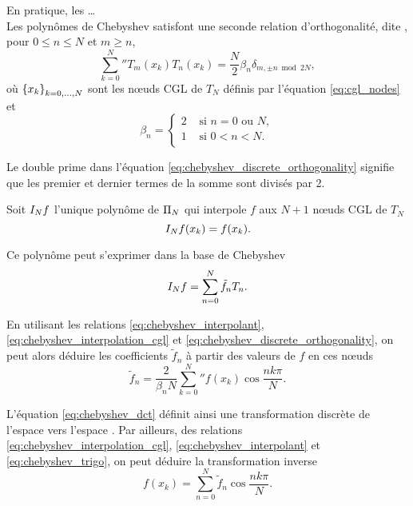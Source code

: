 En pratique, les  \ldots\\
Les polynômes de Chebyshev satisfont une seconde relation d'orthogonalité, dite , pour $0 \leq n \leq N$ et $m \geq n$,
\begin{equation}
	\sum_{k=0}^{N}{''} T_m(x_k) T_n(x_k) = 
	\frac{N}{2} \beta_n \delta_{m,\pm n \bmod{2N}},
	\label{eq:chebyshev_discrete_orthogonality}
\end{equation}
où $\family{x}{k}{0}{N}$ sont les n\oe uds CGL de $T_N$ définis par l'équation \eqref{eq:cgl_nodes} et
\begin{equation}
	\beta_n = 
	\begin{cases}
	 2 & \text{\ si\ } n = 0 \text{\ ou\ } N,   \\ 
	 1 & \text{\ si\ } 0 < n < N.\\ 
	\end{cases}
\end{equation}

Le double prime dans l'équation \eqref{eq:chebyshev_discrete_orthogonality} signifie que les premier et dernier termes de la somme sont divisés par 2.
\par


Soit $\interpolant{f}{N}$ l'unique polynôme de $\polyspace{N}$ qui interpole $f$ aux $N+1$ n\oe uds CGL de $T_N$
\begin{equation}
	\interpolant{f}{N}(x_k) = f(x_k).
	\label{eq:chebyshev_interpolation_cgl}
\end{equation}

Ce polynôme peut s'exprimer dans la base de Chebyshev
\begin{equation}
	\interpolant{f}{N} = \sum_{n=0}^{N} \tilde{f}_n T_n.
	\label{eq:chebyshev_interpolant}
\end{equation}

En utilisant les relations \eqref{eq:chebyshev_interpolant}, \eqref{eq:chebyshev_interpolation_cgl} et \eqref{eq:chebyshev_discrete_orthogonality}, on peut alors déduire les coefficients $\tilde{f}_n$ à partir des valeurs de $f$ en ces n\oe uds%
\begin{equation}
	\tilde{f}_n = \frac{2}{\beta_n N} \sum_{k=0}^{N} {''} f(x_k) \cos \frac{n k \pi}{N}.
	\label{eq:chebyshev_dct}
\end{equation}

L'équation \eqref{eq:chebyshev_dct} définit ainsi une transformation discrète de l'espace  vers l'espace . 
Par ailleurs, des relations \eqref{eq:chebyshev_interpolation_cgl}, \eqref{eq:chebyshev_interpolant} et \eqref{eq:chebyshev_trigo}, on peut déduire la transformation inverse
\begin{equation}
	f(x_k) = \sum_{n=0}^{N} \tilde{f}_n \cos \frac{n k \pi}{N}.
	\label{eq:chebyshev_idct}
\end{equation}

